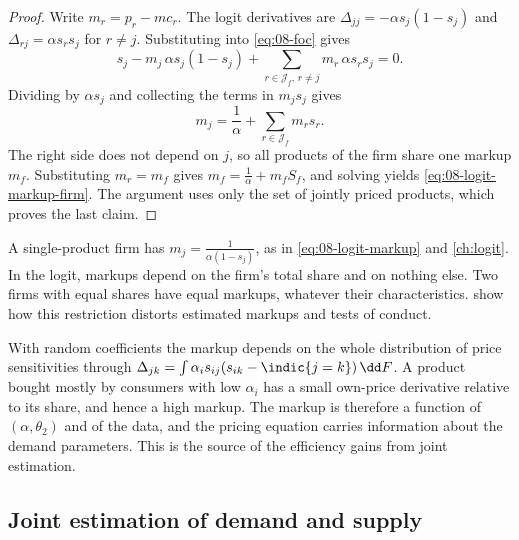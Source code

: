 \begin{proof}
Write $m_r = p_r - mc_r$. The logit derivatives are $\Delta_{jj} = -\alpha s_j(1 - s_j)$ and $\Delta_{rj} = \alpha s_r
s_j$ for $r \neq j$. Substituting into \eqref{eq:08-foc} gives
\begin{equation*}
  s_j - m_j\,\alpha s_j(1 - s_j) + \sum_{r \in \mathcal{J}_f,\, r \neq j} m_r\,\alpha s_r s_j = 0 .
\end{equation*}
Dividing by $\alpha s_j$ and collecting the terms in $m_j s_j$ gives
\begin{equation*}
  m_j = \frac{1}{\alpha} + \sum_{r \in \mathcal{J}_f} m_r s_r .
\end{equation*}
The right side does not depend on $j$, so all products of the firm share one markup $m_f$. Substituting $m_r = m_f$
gives $m_f = \frac{1}{\alpha} + m_f S_f$, and solving yields \eqref{eq:08-logit-markup-firm}. The argument uses only
the set of jointly priced products, which proves the last claim.
\end{proof}

A single-product firm has $m_j = \frac{1}{\alpha(1 - s_j)}$, as in \eqref{eq:08-logit-markup} and \cref{ch:logit}. In
the logit, markups depend on the firm's total share and on nothing else. Two firms with equal shares have equal
markups, whatever their characteristics.  show how this restriction distorts
estimated markups and tests of conduct.

With random coefficients the markup depends on the whole distribution of price sensitivities through
$\Delta_{jk} = \int \alpha_i s_{ij}(s_{ik} - \indic\{j=k\})\,\dd F$. A product bought mostly by consumers with low
$\alpha_i$ has a small own-price derivative relative to its share, and hence a high markup. The markup is therefore a
function of $(\alpha, \theta_2)$ and of the data, and the pricing equation carries information about the demand
parameters. This is the source of the efficiency gains from joint estimation.

\subsection{Joint estimation of demand and supply}\label{sec:08-supply-joint}

